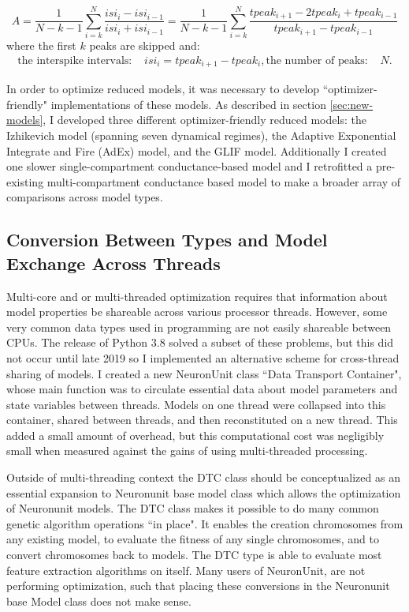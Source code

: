 \begin{equation}
A = \frac{1}{N - k - 1} \sum_{i = k}^N \frac{isi_i - isi_{i-1}}{isi_i + isi_{i-1}}
  = \frac{1}{N - k - 1} \sum_{i = k}^N \frac{tpeak_{i+1} - 2 tpeak_i + tpeak_{i-1}}{tpeak_{i+1} - tpeak_{i-1}}
\end{equation}
where the first $k$ peaks are skipped and:
\begin{align}
    \textrm{the interspike intervals:    } & isi_i = tpeak_{i+1} - tpeak_i,
    \textrm{the number of peaks:    } & N.
\end{align}
  

In order to optimize reduced models, it was necessary to develop ``optimizer-friendly" implementations of these models.
As described in section \ref{sec:new-models}, I developed three different optimizer-friendly reduced models: the Izhikevich model (spanning seven dynamical regimes), the Adaptive Exponential Integrate and Fire (AdEx) model, and the GLIF model.
Additionally I created one slower single-compartment conductance-based model and I retrofitted a pre-existing multi-compartment conductance based model to make a broader array of comparisons across model types.

\subsection{Conversion Between Types and Model Exchange Across Threads}
Multi-core and or multi-threaded optimization requires that information about model properties be shareable across various processor threads.
However, some very common data types used in programming are not easily shareable between CPUs.
The release of Python 3.8 solved a subset of these problems, but this did not occur until late 2019 so I implemented an alternative scheme for cross-thread sharing of models.
I created a new NeuronUnit class ``Data Transport Container", whose main function was to circulate essential data about model parameters and state variables between threads.
Models on one thread were collapsed into this container, shared between threads, and then reconstituted on a new thread.
This added a small amount of overhead, but this computational cost was negligibly small when measured against the gains of using multi-threaded processing.

Outside of multi-threading context the DTC class should be conceptualized as an essential expansion to Neuronunit base model class which allows the optimization of Neuronunit models. The DTC class makes it possible to do many common genetic algorithm operations ``in place". It enables the creation chromosomes from any existing model, to evaluate the fitness of any single chromosomes, and to convert chromosomes back to models. The DTC type is able to evaluate most feature extraction algorithms on itself. Many users of NeuronUnit, are not performing optimization, such that placing these conversions in the Neuronunit base Model class does not make sense.

